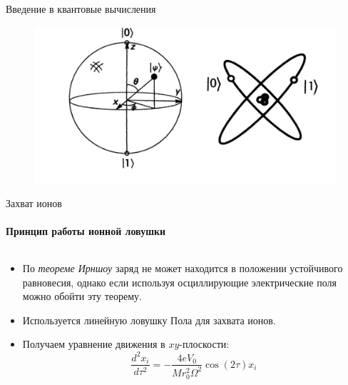 \documentclass{beamer}
\begin{document}
	\begin{frame}{Введение в квантовые вычисления}
		
		\begin{figure}[]
			\includegraphics[width=\linewidth]{media/qubits.pdf}
		\end{figure}
	\end{frame}

    \begin{frame}{Захват ионов}
    \framesubtitle{Принцип работы ионной ловушки}

        \begin{columns}

        \begin{column}{1\textwidth}

            \begin{itemize}
                \item По \textit{теореме Ирншоу} заряд не может находится в положении устойчивого равновесия, однако если используя осциллирующие электрические поля можно обойти эту теорему.
                \item Используется линейную ловушку Пола для захвата ионов.
               	\item Получаем уравнение движения в $xy$-плоскости:
               	\begin{equation}
\frac{d^2 x_i}{d \tau^2}=-\frac{4 e V_0}{M r_0^2 \Omega^2} \cos (2 \tau) x_i
\end{equation}
            \end{itemize}

        \end{column}


        \end{columns}

    \end{frame}
		
\end{document}
